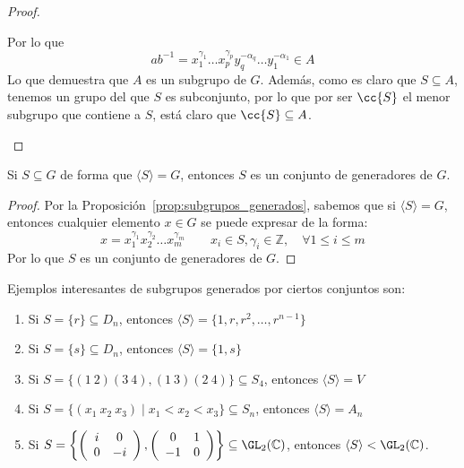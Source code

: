 \begin{prop}
\begin{proof}
\begin{itemize}
\begin{description}
\begin{equation*}
{}                        \end{equation*}
                        Por lo que
                        \begin{equation*}
                            ab^{-1} = x_1^{\gamma_1} \ldots x_p^{\gamma_p} y_q^{-\alpha_q} \ldots y_1^{-\alpha_1} \in A
                        \end{equation*}
                        Lo que demuestra que $A$ es un subgrupo de $G$. Además, como es claro que $S\subseteq A$, tenemos un grupo del que $S$ es subconjunto, por lo que por ser $\cc{S}$ el menor subgrupo que contiene a $S$, está claro que $\cc{S}\subseteq A$.\qedhere
                \end{description}
        \end{itemize}
    \end{proof}
\end{prop}

\begin{coro}
    Si $S\subseteq G$ de forma que $\langle S \rangle =G$, entonces $S$ es un conjunto de generadores de $G$.
    \begin{proof}
        Por la Proposición~\ref{prop:subgrupos_generados}, sabemos que si $\langle S \rangle = G$, entonces cualquier elemento $x\in G$ se puede expresar de la forma:
        \begin{equation*}
            x = x_1^{\gamma_1}x_2^{\gamma_2}\ldots x_m^{\gamma_m} \qquad x_i \in S, \gamma_i \in \mathbb{Z}, \quad \forall 1\leq i \leq m
        \end{equation*}
        Por lo que $S$ es un conjunto de generadores de $G$.
    \end{proof}
\end{coro}

\begin{ejemplo}
    Ejemplos interesantes de subgrupos generados por ciertos conjuntos son:
    \begin{enumerate}
        \item Si $S= \{r\}\subseteq D_n$, entonces $\langle S \rangle = \{1,r,r^2, \ldots, r^{n-1}\}$
        \item Si $S = \{s\}\subseteq D_n$, entonces $\langle S \rangle = \{1, s\}$
        \item Si $S = \{(1\ 2)(3\ 4), (1\ 3)(2\ 4)\}\subseteq S_4$, entonces $\langle S \rangle = V$
        \item Si $S=\{(x_1\ x_2\ x_3) \mid x_1<x_2<x_3\}\subseteq S_n$, entonces $\langle S \rangle = A_n$
        \item Si $S = \left\{\left(\begin{array}{cc}
            i & 0 \\
            0 & -i 
        \end{array}\right),  \left(\begin{array}{cc}
            0 & 1 \\
            -1 & 0 
        \end{array}\right)\right\}\subseteq \GL_2(\mathbb{C})$, entonces $\langle S \rangle < \GL_2(\mathbb{C})$.
    \end{enumerate}
\end{ejemplo}

